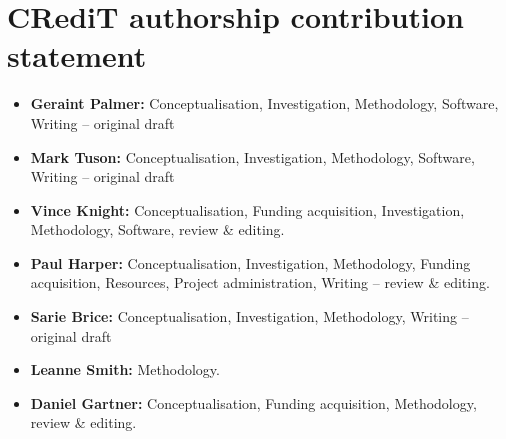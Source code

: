 \documentclass[preprint,12pt]{elsarticle}
\begin{document}




\section*{CRediT authorship contribution statement}
\begin{itemize}
  \item {\bf Geraint Palmer:} Conceptualisation, Investigation, Methodology, Software, Writing – original draft
  \item {\bf Mark Tuson:} Conceptualisation, Investigation, Methodology, Software, Writing – original draft
  \item {\bf Vince Knight:} Conceptualisation, Funding acquisition, Investigation, Methodology, Software, review \& editing.
  \item {\bf Paul Harper:} Conceptualisation, Investigation, Methodology, Funding acquisition, Resources, Project administration, Writing – review \& editing.
  \item {\bf Sarie Brice:} Conceptualisation, Investigation, Methodology, Writing – original draft
  \item {\bf Leanne Smith:} Methodology.
  \item {\bf Daniel Gartner:} Conceptualisation, Funding acquisition, Methodology, review \& editing.
\end{itemize}
\end{document}
